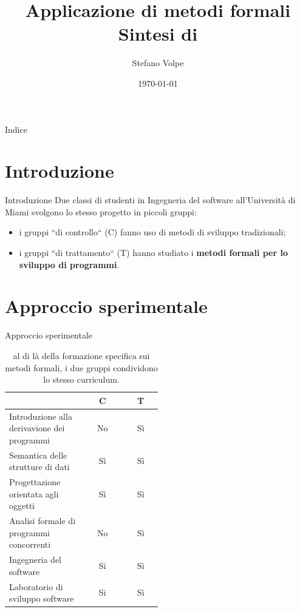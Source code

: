 \documentclass{beamer}
\title{
	Applicazione di metodi formali \\
	\small Sintesi di \cite{sobel}
}
\author{Stefano Volpe}
\institute{Università di Bologna}
\date{\today}
\begin{document}
\begin{frame}
	\titlepage
\end{frame}

\begin{frame}{Indice}
	\tableofcontents
\end{frame}

\section{Introduzione}
\begin{frame}{Introduzione}
	Due classi di studenti in Ingegneria del software all'Università di Miami
	svolgono lo stesso progetto in piccoli gruppi:
	\begin{itemize}
		\item i gruppi ``di controllo`` (C) fanno uso di metodi di sviluppo
		      tradizionali;
		\item i gruppi ``di trattamento`` (T) hanno studiato i \textbf{metodi
			      formali per lo sviluppo di programmi}.
	\end{itemize}
\end{frame}

\section{Approccio sperimentale}
\begin{frame}{Approccio sperimentale}
	\begin{table}
		\begin{tabular}{|p{0.5\linewidth}|c|c|}
			\hline
			                                            & C  & T  \\
			\hline
			Introduzione alla derivavione dei programmi & No & Sì \\
			\hline
			Semantica delle strutture di dati           & Sì & Sì \\
			\hline
			Progettazione orientata agli oggetti        & Sì & Sì \\
			\hline
			Analisi formale di programmi concorrenti    & No & Sì \\
			\hline
			Ingegneria del software                     & Si & Sì \\
			\hline
			Laboratorio di sviluppo software            & Si & Sì \\
			\hline
		\end{tabular}
		\caption{al di là della formazione specifica sui metodi formali, i due
			gruppi condividono lo stesso curriculum.}
	\end{table}

\end{frame}
\end{document}
